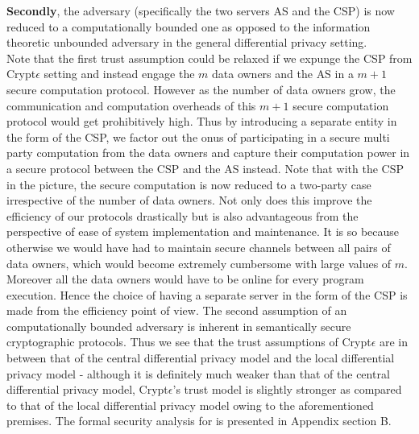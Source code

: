  \textbf{Secondly}, the adversary (specifically the two servers \textsf{AS} and the \textsf{CSP}) is now reduced to a computationally bounded one as opposed to the information theoretic unbounded adversary in the general differential privacy setting.\\
Note that the first trust assumption could be relaxed if we expunge the \textsf{CSP} from Crypt$\epsilon$ setting and instead engage the $m$ data owners and the \textsf{AS} in a $m+1$ secure computation protocol. However as the number of data owners grow, the communication and computation overheads of this $m+1$ secure computation protocol would get prohibitively high. Thus by introducing a separate entity in the form of the \textsf{CSP}, we factor out the onus of participating in a secure multi party computation from the data owners and capture their computation power in a secure protocol between the \textsf{CSP} and the \textsf{AS} instead. Note that with the \textsf{CSP} in the picture, the secure computation is now reduced to a two-party case irrespective of the number of data owners. Not only does this improve the efficiency of our protocols drastically but is also advantageous from the perspective of ease of system implementation and maintenance. It is so because otherwise we would have had to maintain secure channels between all pairs of data owners, which would become extremely cumbersome with large values of $m$. Moreover all the data owners would have to be online for every program execution. Hence the choice of having a separate server in the form of the \textsf{CSP} is made from the efficiency point of view.
The second assumption of an computationally bounded adversary is inherent in semantically secure cryptographic protocols. Thus we see that the trust assumptions of Crypt$\epsilon$ are in between that of the central differential privacy model and the local differential privacy model - although it is definitely much weaker than that of the central differential privacy model, Crypt$\epsilon$'s trust model is slightly stronger as compared to that of the local differential privacy model owing to the aforementioned premises. The formal security analysis for \system is presented in Appendix section B. %
